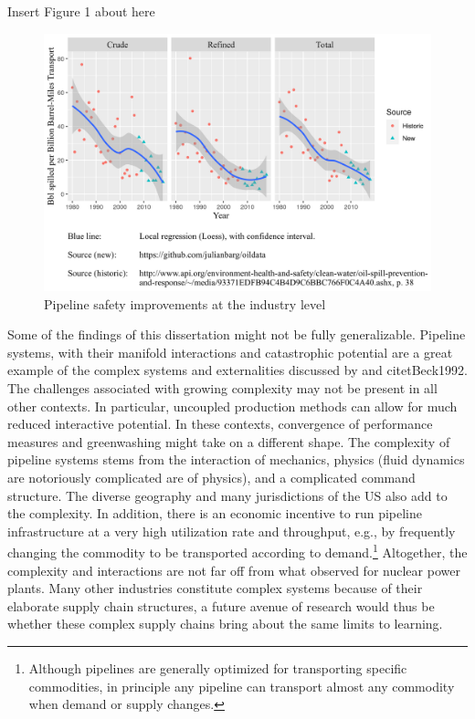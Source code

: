 {\noindent}\dotfill

	\centerline{Insert Figure 1 about here}

{\noindent}\dotfill

\begin{figure}
	\caption{Pipeline safety improvements at the industry level}
	\centerline{\includegraphics{../illustrations/population_learning_4.png}}
\end{figure}

Some of the findings of this dissertation might not be fully generalizable. Pipeline systems, with their manifold interactions and catastrophic potential are a great example of the complex systems and externalities discussed by \citet{Perrow1984} and citet{Beck1992}. The challenges associated with growing complexity may not be present in all other contexts. In particular, uncoupled production methods can allow for much reduced interactive potential. In these contexts, convergence of performance measures and greenwashing might take on a different shape. The complexity of pipeline systems stems from the interaction of mechanics, physics (fluid dynamics are notoriously complicated are of physics), and a complicated command structure. The diverse geography and many jurisdictions of the US also add to the complexity. In addition, there is an economic incentive to run pipeline infrastructure at a very high utilization rate and throughput, e.g., by frequently changing the commodity to be transported according to demand.\footnote{Although pipelines are generally optimized for transporting specific commodities, in principle any pipeline can transport almost any commodity when demand or supply changes.} Altogether, the complexity and interactions are not far off from what \citet{Perrow1984} observed for nuclear power plants. Many other industries constitute complex systems because of their elaborate supply chain structures, a future avenue of research would thus be whether these complex supply chains bring about the same limits to learning.

